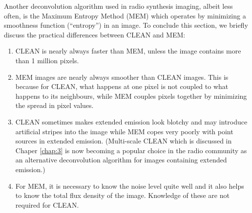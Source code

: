 Another deconvolution algorithm used in radio synthesis imaging, albeit less often, is the Maximum Entropy Method (MEM) which operates by minimizing a smoothness function (``entropy'') in an image. To conclude this section, we briefly discuss the practical differences between CLEAN and MEM:
\begin{enumerate}
\item CLEAN is nearly always faster than MEM, unless the image contains more than 1 million pixels.
\item MEM images are nearly always smoother than CLEAN images. This is because for CLEAN, what happens at one pixel is not coupled to what happens to its neighbours, while MEM couples pixels together by minimizing the spread in pixel values.
\item CLEAN sometimes makes extended emission look blotchy and may introduce artificial stripes into the image while MEM copes very poorly with point sources in extended emission. (Multi-scale CLEAN which is discussed in Chaper \ref{chap:3} is now becoming a popular choice in the radio community as an alternative deconvolution algorithm for images containing extended emission.)
\item For MEM, it is necessary to know the noise level quite well and it also helps to know the total flux density of the image. Knowledge of these are not required for CLEAN.
\end{enumerate}

